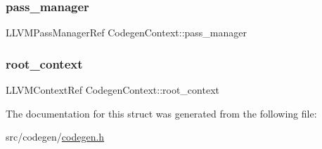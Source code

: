 \subsubsection{\texorpdfstring{pass\+\_\+manager}{pass\_manager}}
{\footnotesize\ttfamily L\+L\+V\+M\+Pass\+Manager\+Ref Codegen\+Context\+::pass\+\_\+manager}

\hypertarget{structCodegenContext_afae1864ec9a3561f4461d072c255700c}{}\label{structCodegenContext_afae1864ec9a3561f4461d072c255700c} 
\subsubsection{\texorpdfstring{root\+\_\+context}{root\_context}}
{\footnotesize\ttfamily L\+L\+V\+M\+Context\+Ref Codegen\+Context\+::root\+\_\+context}



The documentation for this struct was generated from the following file\+:\begin{DoxyCompactItemize}
\item 
src/codegen/\hyperlink{codegen_8h}{codegen.\+h}\end{DoxyCompactItemize}
